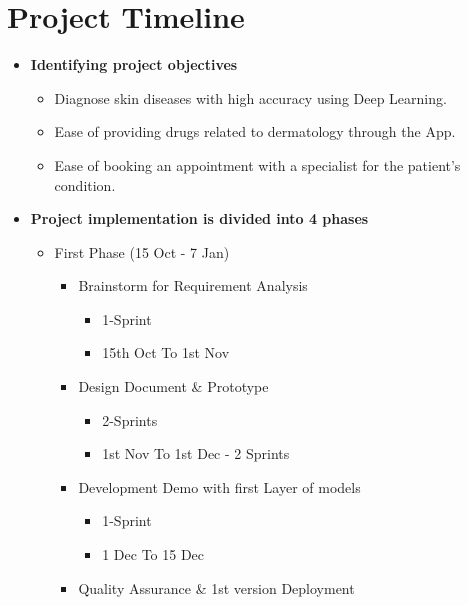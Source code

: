 \section{Project Timeline}
\begin{itemize}
    \item\textbf{Identifying project objectives} 
       \begin{itemize}
         \item Diagnose skin diseases with high accuracy using Deep Learning.\\
         \item Ease of providing drugs related to dermatology through the App.\\
         \item Ease of booking an appointment with a specialist for the patient's condition.\\
       \end{itemize}
    \item \textbf{Project implementation is divided into 4 phases}
       \begin{itemize}
           \item First Phase (15 Oct - 7 Jan)
             \begin{itemize}
                 \item Brainstorm for Requirement Analysis 
                    \begin{itemize}
                        \item 1-Sprint
                        \item 15th Oct  To 1st Nov
                    \end{itemize}
                \item Design Document \&  Prototype  
                     \begin{itemize}
                        \item 2-Sprints
                        \item 1st Nov To 1st Dec - 2 Sprints
                    \end{itemize}
                \item Development Demo with first Layer of models  
                     \begin{itemize}
                        \item 1-Sprint
                        \item 1 Dec To 15 Dec
                    \end{itemize}
                \item Quality Assurance \& 1st version Deployment

\end{itemize}
\end{itemize}
\end{itemize}
